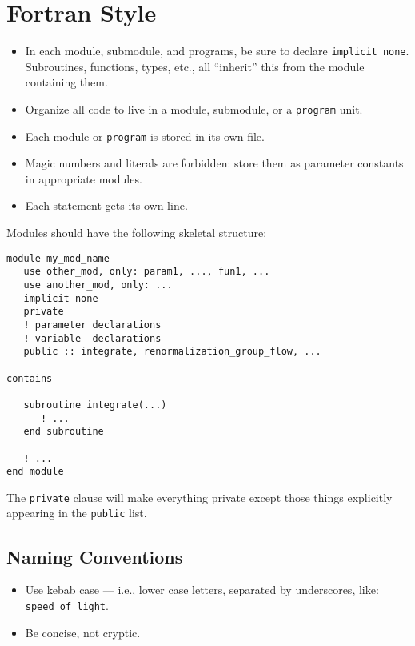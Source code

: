 \chapter{Fortran Style}

\begin{itemize}
\item In each module, submodule, and programs, be sure to declare
  \verb|implicit none|. Subroutines, functions, types, etc., all
  ``inherit'' this from the module containing them.
\item Organize all code to live in a module, submodule, or a
  \verb|program| unit.
\item Each module or \verb|program| is stored in its own file.
\item Magic numbers and literals are forbidden: store them as parameter
  constants in appropriate modules.
\item Each statement gets its own line.
\end{itemize}

Modules should have the following skeletal structure:
\begin{verbatim}
module my_mod_name
   use other_mod, only: param1, ..., fun1, ...
   use another_mod, only: ...
   implicit none
   private
   ! parameter declarations
   ! variable  declarations
   public :: integrate, renormalization_group_flow, ...

contains

   subroutine integrate(...)
      ! ...
   end subroutine

   ! ...
end module
\end{verbatim}
The \verb|private| clause will make everything private except those
things explicitly appearing in the \verb|public| list.

\section{Naming Conventions}

\begin{itemize}
\item Use kebab case --- i.e., lower case letters, separated by
  underscores, like: \verb|speed_of_light|.
\item Be concise, not cryptic.
\end{itemize}